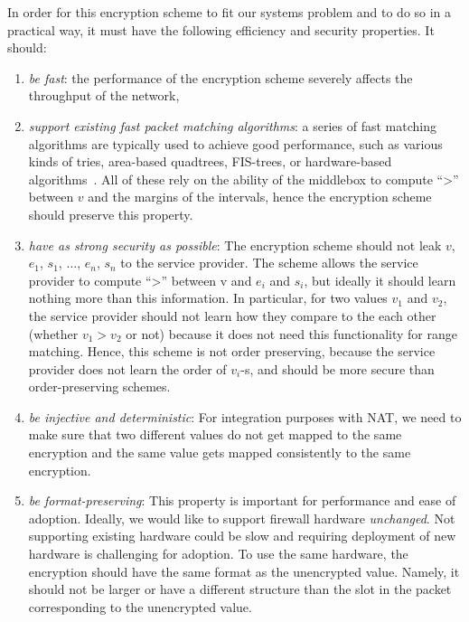 %
In order for this encryption scheme to fit our systems problem and to do so in a practical way, it must have the following efficiency and security properties. It should:
\begin{enumerate}
\item  {\em be fast}: the performance of the encryption scheme severely affects the throughput of the network,
\item {\em support existing fast packet matching algorithms}: a series of fast matching algorithms are typically used to achieve good performance, such as  various kinds of tries, area-based quadtrees, FIS-trees, or hardware-based algorithms~\cite{packet_classif}.  All of these rely on the ability of the middlebox to compute ``>'' between $v$ and the margins of the intervals, 
hence the encryption scheme should preserve this property. 
\item {\em have as strong security as possible}: The encryption scheme should not leak $v$, $e_1$, $s_1$, $\dots$, $e_n$, $s_n$ to the service provider.
The scheme allows the service provider to compute ``>'' between v and $e_i$ and $s_i$, but ideally it should learn nothing more than this information. In particular, for two values $v_1$ and $v_2$, the service provider should not learn how they compare to the each other (whether $v_1 > v_2$ or not) because it does not need this functionality for range matching. Hence, this scheme is not order preserving, because the service provider does not learn the order of $v_i$-s, and should be more secure than order-preserving schemes.   \label{req:sec}
\item {\em be injective and deterministic}: For integration purposes with NAT, we need to make sure that two different values do not get mapped to the same encryption and the same value gets mapped consistently to the same encryption. \label{req:injective}
\item {\em be format-preserving}: This property is important for performance and ease of adoption. Ideally,  we would like to support firewall hardware {\em unchanged}. Not supporting existing hardware could be slow and requiring deployment of new hardware is challenging for adoption. To use the same hardware, the  encryption should have the same format as the unencrypted value. Namely, it should not be larger or have a different structure than the slot in the packet corresponding to the unencrypted value. 
 \end{enumerate}
 
 
